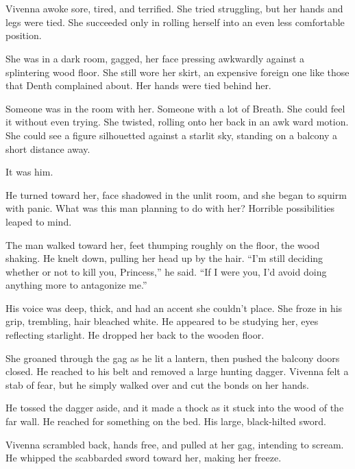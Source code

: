 \chapter{}

Vivenna awoke sore, tired, and terrified. She tried struggling, but her hands and legs were tied. She succeeded only in rolling herself into an even less comfortable position.

She was in a dark room, gagged, her face pressing awkwardly against a splintering wood floor. She still wore her skirt, an expensive foreign one like those that Denth complained about. Her hands were tied behind her.

Someone was in the room with her. Someone with a lot of Breath. She could feel it without even trying. She twisted, rolling onto her back in an awk ward motion. She could see a figure silhouetted against a starlit sky, standing on a balcony a short distance away.

It was him.

He turned toward her, face shadowed in the unlit room, and she began to squirm with panic. What was this man planning to do with her? Horrible possibilities leaped to mind.

The man walked toward her, feet thumping roughly on the floor, the wood shaking. He knelt down, pulling her head up by the hair. “I’m still deciding whether or not to kill you, Princess,” he said. “If I were you, I’d avoid doing anything more to antagonize me.”

His voice was deep, thick, and had an accent she couldn’t place. She froze in his grip, trembling, hair bleached white. He appeared to be studying her, eyes reflecting starlight. He dropped her back to the wooden floor.

She groaned through the gag as he lit a lantern, then pushed the balcony doors closed. He reached to his belt and removed a large hunting dagger. Vivenna felt a stab of fear, but he simply walked over and cut the bonds on her hands.

He tossed the dagger aside, and it made a thock as it stuck into the wood of the far wall. He reached for something on the bed. His large, black-hilted sword.

Vivenna scrambled back, hands free, and pulled at her gag, intending to scream. He whipped the scabbarded sword toward her, making her freeze.

